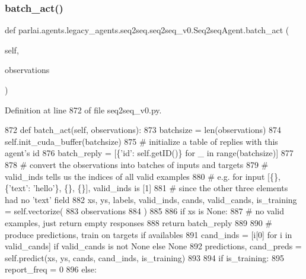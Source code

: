 \subsubsection{\texorpdfstring{batch\+\_\+act()}{batch\_act()}}
{\footnotesize\ttfamily def parlai.\+agents.\+legacy\+\_\+agents.\+seq2seq.\+seq2seq\+\_\+v0.\+Seq2seq\+Agent.\+batch\+\_\+act (\begin{DoxyParamCaption}\item[{}]{self,  }\item[{}]{observations }\end{DoxyParamCaption})}



Definition at line 872 of file seq2seq\+\_\+v0.\+py.


\begin{DoxyCode}
872     \textcolor{keyword}{def }batch\_act(self, observations):
873         batchsize = len(observations)
874         self.init\_cuda\_buffer(batchsize)
875         \textcolor{comment}{# initialize a table of replies with this agent's id}
876         batch\_reply = [\{\textcolor{stringliteral}{'id'}: self.getID()\} \textcolor{keywordflow}{for} \_ \textcolor{keywordflow}{in} range(batchsize)]
877 
878         \textcolor{comment}{# convert the observations into batches of inputs and targets}
879         \textcolor{comment}{# valid\_inds tells us the indices of all valid examples}
880         \textcolor{comment}{# e.g. for input [\{\}, \{'text': 'hello'\}, \{\}, \{\}], valid\_inds is [1]}
881         \textcolor{comment}{# since the other three elements had no 'text' field}
882         xs, ys, labels, valid\_inds, cands, valid\_cands, is\_training = self.vectorize(
883             observations
884         )
885 
886         \textcolor{keywordflow}{if} xs \textcolor{keywordflow}{is} \textcolor{keywordtype}{None}:
887             \textcolor{comment}{# no valid examples, just return empty responses}
888             \textcolor{keywordflow}{return} batch\_reply
889 
890         \textcolor{comment}{# produce predictions, train on targets if availables}
891         cand\_inds = [i[0] \textcolor{keywordflow}{for} i \textcolor{keywordflow}{in} valid\_cands] \textcolor{keywordflow}{if} valid\_cands \textcolor{keywordflow}{is} \textcolor{keywordflow}{not} \textcolor{keywordtype}{None} \textcolor{keywordflow}{else} \textcolor{keywordtype}{None}
892         predictions, cand\_preds = self.predict(xs, ys, cands, cand\_inds, is\_training)
893 
894         \textcolor{keywordflow}{if} is\_training:
895             report\_freq = 0
896         \textcolor{keywordflow}{else}:

\end{DoxyCode}
